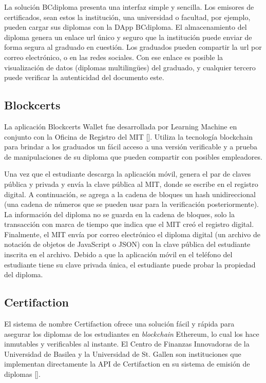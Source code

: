 La solución BCdiploma presenta una interfaz simple y sencilla. Los emisores de certificados, sean estos la institución, una universidad o facultad, por ejemplo, pueden cargar sus diplomas con la DApp BCdiploma. El almacenamiento del diploma genera un enlace url único y seguro que la institución puede enviar de forma segura al graduado en cuestión. Los graduados pueden compartir la url por correo electrónico, o en las redes sociales. Con ese enlace es posible la visualización de datos (diplomas multilingües) del graduado, y cualquier tercero puede verificar la autenticidad del documento este. 

\subsection{Blockcerts}
La aplicación Blockcerts Wallet fue desarrollada por Learning Machine en conjunto con la Oficina de Registro del MIT [\cite{81, 79}]. Utiliza la tecnología blockchain para brindar a los graduados un fácil acceso a una versión verificable y a prueba de manipulaciones de su diploma que pueden compartir con posibles empleadores. %

Una vez que el estudiante descarga la aplicación móvil, genera el par de claves pública y privada y envía la clave pública al MIT, donde se escribe en el registro digital. A continuación, se agrega a la cadena de bloques un hash unidireccional (una cadena de números que se pueden usar para la verificación posteriormente). La información del diploma no se guarda en la cadena de bloques, solo la transacción con marca de tiempo que indica que el MIT creó el registro digital. Finalmente, el MIT envía por correo electrónico el diploma digital (un archivo de notación de objetos de JavaScript o JSON) con la clave pública del estudiante inscrita en el archivo. Debido a que la aplicación móvil en el teléfono del estudiante tiene su clave privada única, el estudiante puede probar la propiedad del diploma.

\subsection{Certifaction}
El sistema de nombre Certifaction ofrece una solución fácil y rápida para asegurar los diplomas de los estudiantes en \textit{blockchain} Ethereum, lo cual los hace inmutables y verificables al instante. El Centro de Finanzas Innovadoras de la Universidad de Basilea y la Universidad de St. Gallen son instituciones que implementan directamente la API de Certifaction en su sistema de emisión de diplomas [\cite{82}].

